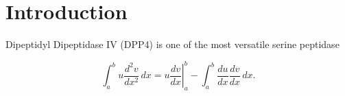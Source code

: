 \section{Introduction}
\label{intro} 

Dipeptidyl Dipeptidase IV (DPP4) is one of the most versatile serine peptidase 

\begin{equation}
\label{eqn:drag}
	\int_a^bu\frac{d^2v}{dx^2}\,dx
	=\left.u\frac{dv}{dx}\right|_a^b
	-\int_a^b\frac{du}{dx}\frac{dv}{dx}\,dx.
\end{equation}
